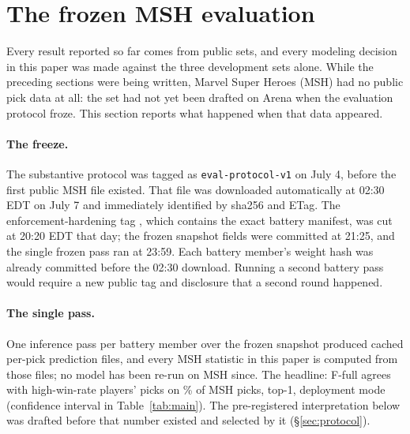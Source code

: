 \section{The frozen MSH evaluation}
\label{sec:msh}
\FloatBarrier

Every result reported so far comes from public sets, and every modeling
decision in this paper was made against the three development sets alone.
While the preceding sections were being written, Marvel Super Heroes
(MSH) had no public pick data at all: the set had not yet been drafted on
Arena when the evaluation protocol froze. This section reports what
happened when that data appeared.

\paragraph{The freeze.}
The substantive protocol was tagged as \texttt{eval-protocol-v1} on July
4, before the first public \seventeenlands{} MSH file existed. That file
was downloaded automatically at 02:30 EDT on July 7 and immediately
identified by sha256 and ETag. The enforcement-hardening tag
\texttt{\ProtocolTag}, which contains the exact battery manifest, was cut
at 20:20 EDT that day; the frozen snapshot fields were committed at 21:25,
and the single frozen pass ran at 23:59. Each battery member's weight hash
was already committed before the 02:30 download. Running a second battery
pass would require a new public tag and disclosure that a second round
happened.

\paragraph{The single pass.}
One inference pass per battery member over the frozen snapshot produced
cached per-pick prediction files, and every MSH statistic in this paper
is computed from those files; no model has been re-run on MSH since.
The headline: F-full agrees with high-win-rate players' picks on
\FfullMsh\% of MSH picks, top-1, deployment mode (confidence interval in
Table~\ref{tab:main}). The pre-registered interpretation below was
drafted before that number existed and selected by it
(\S\ref{sec:protocol}).

